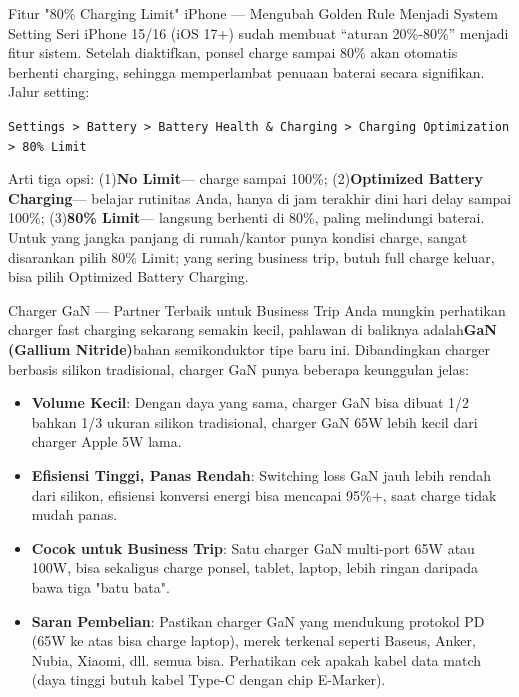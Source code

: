\begin{tcbinfo}{Fitur "80\% Charging Limit" iPhone — Mengubah Golden Rule Menjadi System Setting}
Seri iPhone 15/16 (iOS 17+) sudah membuat “aturan 20\%-80\%” menjadi fitur sistem. Setelah diaktifkan, ponsel charge sampai 80\% akan otomatis berhenti charging, sehingga memperlambat penuaan baterai secara signifikan. Jalur setting:

\texttt{Settings > Battery > Battery Health \& Charging > Charging Optimization > 80\% Limit}

Arti tiga opsi: (1)\textbf{No Limit}— charge sampai 100\%; (2)\textbf{Optimized Battery Charging}— belajar rutinitas Anda, hanya di jam terakhir dini hari delay sampai 100\%; (3)\textbf{80\% Limit}— langsung berhenti di 80\%, paling melindungi baterai. Untuk yang jangka panjang di rumah/kantor punya kondisi charge, sangat disarankan pilih 80\% Limit; yang sering business trip, butuh full charge keluar, bisa pilih Optimized Battery Charging.

\end{tcbinfo}

\begin{tcbinfo}{Charger GaN — Partner Terbaik untuk Business Trip}
Anda mungkin perhatikan charger fast charging sekarang semakin kecil, pahlawan di baliknya adalah\textbf{GaN (Gallium Nitride)}bahan semikonduktor tipe baru ini. Dibandingkan charger berbasis silikon tradisional, charger GaN punya beberapa keunggulan jelas:

\begin{itemize}
  \item \textbf{Volume Kecil}: Dengan daya yang sama, charger GaN bisa dibuat 1/2 bahkan 1/3 ukuran silikon tradisional, charger GaN 65W lebih kecil dari charger Apple 5W lama.
  \item \textbf{Efisiensi Tinggi, Panas Rendah}: Switching loss GaN jauh lebih rendah dari silikon, efisiensi konversi energi bisa mencapai 95\%+, saat charge tidak mudah panas.
  \item \textbf{Cocok untuk Business Trip}: Satu charger GaN multi-port 65W atau 100W, bisa sekaligus charge ponsel, tablet, laptop, lebih ringan daripada bawa tiga "batu bata".
  \item \textbf{Saran Pembelian}: Pastikan charger GaN yang mendukung protokol PD (65W ke atas bisa charge laptop), merek terkenal seperti Baseus, Anker, Nubia, Xiaomi, dll. semua bisa. Perhatikan cek apakah kabel data match (daya tinggi butuh kabel Type-C dengan chip E-Marker).
\end{itemize}

\end{tcbinfo}

